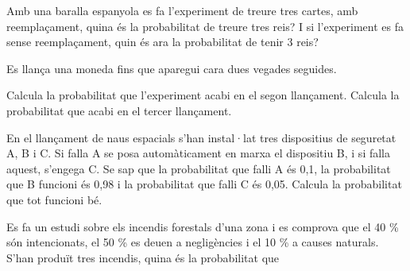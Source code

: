 \begin{mylist}
 \exer Amb una baralla espanyola es fa l'experiment de treure tres cartes, amb reemplaçament, quina és la probabilitat de treure tres reis? I si l'experiment es fa sense reemplaçament, quin és ara la probabilitat de tenir 3 reis? 
 
 \answers[cols=1]{[Amb reemplaçament $P(RRR)=\frac{4}{40}\cdot \frac{4}{40} \cdot \frac{4}{40} =\frac{1}{1000}=0.001$,
 	Sense reemplaçament $P(RRR)=\frac{4}{40}\cdot \frac{3}{39} \cdot \frac{2}{38} =\frac{1}{2470}=0.0004$]}
 
 \newpage
\exer  Es llança una moneda fins que aparegui cara dues vegades seguides. 

\begin{tasks}
	\task  Calcula la probabilitat que l'experiment acabi en el segon llançament.
	\task  Calcula la probabilitat que acabi en el tercer llançament.
\end{tasks}
\answers[cols=1]{[$P(CC)=\frac{1}{4}$, $P(XCC)=\frac{1}{8}$]}
 

\exer[1]  En el llançament de naus espacials s'han instal·lat tres dispositius de seguretat A, B i C. Si falla A se posa automàticament en marxa el dispositiu B, i si falla aquest, s'engega C. Se sap que la probabilitat que falli A és 0,1, la probabilitat que B funcioni és 0,98 i la probabilitat que falli C és 0,05. Calcula la probabilitat que tot funcioni bé. 
  

 \exer Es fa un estudi sobre els incendis forestals d'una zona i es comprova que el 40 \% són intencionats, el 50 \% es deuen a negligències i el 10 \% a causes naturals. S'han produït tres incendis,  quina és la probabilitat que


\end{mylist}
